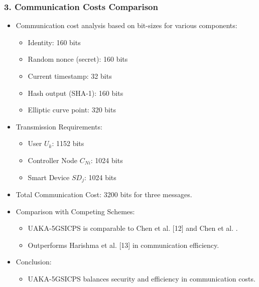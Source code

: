 \documentclass[9pt,handout]{beamer}
\begin{document}
\begin{frame}
    \frametitle{3. Communication Costs Comparison}
    \begin{itemize}
        \item Communication cost analysis based on bit-sizes for various components:
        \begin{itemize}
            \item Identity: 160 bits
            \item Random nonce (secret): 160 bits
            \item Current timestamp: 32 bits
            \item Hash output (SHA-1): 160 bits
            \item Elliptic curve point: 320 bits
        \end{itemize}
        \item Transmission Requirements:
        \begin{itemize}
            \item User \( U_k \): 1152 bits
            \item Controller Node \( C_{Ni} \): 1024 bits
            \item Smart Device \( SD_j \): 1024 bits
        \end{itemize}
        \item Total Communication Cost: 3200 bits for three messages.
        \item Comparison with Competing Schemes:
        \begin{itemize}
            \item UAKA-5GSICPS is comparable to Chen et al. [12]
 and Chen et al. \cite{chen2019}.
            \item Outperforms Harishma et al. [13]
 in communication efficiency.
        \end{itemize}
        \item Conclusion:
        \begin{itemize}
            \item UAKA-5GSICPS balances security and efficiency in communication costs.
        \end{itemize}
    \end{itemize}
\end{frame}
\end{document}
